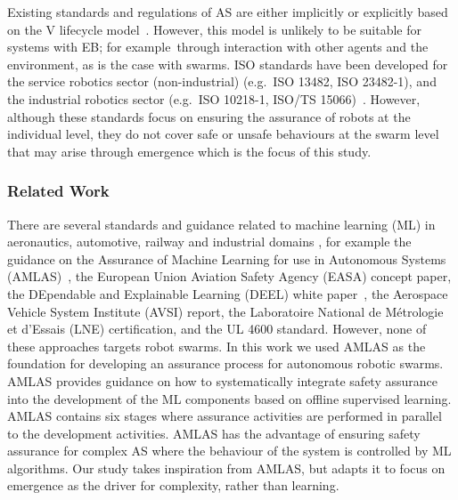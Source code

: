\documentclass[runningheads]{llncs}
\begin{document}
	Existing standards and regulations of AS are either implicitly or explicitly based on the V lifecycle model~\cite{Jia2021}. 
	However, this model is unlikely to be suitable for systems with EB; for example\ through interaction with other agents and the environment, as is the case with swarms. 
	ISO standards have been developed for the service robotics sector (non-industrial) (e.g.\ ISO 13482, ISO 23482-1), and the industrial robotics sector (e.g.\ ISO 10218-1, ISO/TS 15066)~\cite{Abeywickrama2022}. 
	However, although these standards focus on ensuring the assurance of robots at the individual level, they do not cover safe or unsafe behaviours at the swarm level that may arise through emergence which is the focus of this study.
	
	\subsubsection{Related Work} 
	There are several standards and guidance related to machine learning (ML) in aeronautics, automotive, railway and industrial domains \cite{Kaakai2022}, for example the guidance on the Assurance of Machine Learning for use in Autonomous Systems (AMLAS)~\cite{Hawkins2021}, the European Union Aviation Safety Agency (EASA) concept paper, the DEpendable and Explainable Learning (DEEL) white paper~\cite{Mamalet2021}, the Aerospace Vehicle System Institute (AVSI) report, the Laboratoire National de Métrologie et d'Essais (LNE) certification, and the UL 4600 standard. However, none of these approaches targets robot swarms. 
	In this work we used AMLAS \cite{Hawkins2021} as the foundation for developing an assurance process for autonomous robotic swarms. 
	AMLAS provides guidance on how to systematically integrate safety assurance into the development of the ML components based on offline supervised learning. 
	AMLAS contains six stages where assurance activities are performed in parallel to the development activities. 
	AMLAS has the advantage of ensuring safety assurance for complex AS where the behaviour of the system is controlled by ML algorithms. 
	Our study takes inspiration from AMLAS, but adapts it to focus on emergence as the driver for complexity, rather than learning. 
\end{document}
